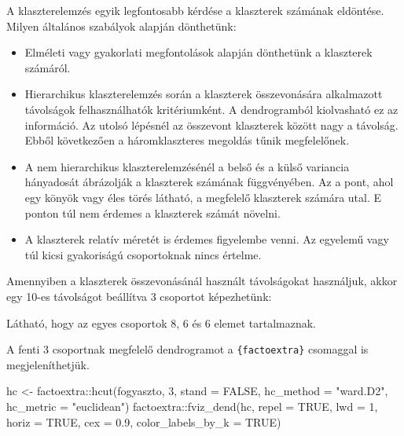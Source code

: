 \documentclass[
  letterpaper,
]{krantz}
\makeatletter
\newenvironment{Shaded}{\begin{snugshade}}{\end{snugshade}}
\newcommand{\AttributeTok}[1]{\textcolor[rgb]{0.40,0.45,0.13}{#1}}
\newcommand{\CommentTok}[1]{\textcolor[rgb]{0.37,0.37,0.37}{#1}}
\newcommand{\ConstantTok}[1]{\textcolor[rgb]{0.56,0.35,0.01}{#1}}
\newcommand{\DecValTok}[1]{\textcolor[rgb]{0.68,0.00,0.00}{#1}}
\newcommand{\FloatTok}[1]{\textcolor[rgb]{0.68,0.00,0.00}{#1}}
\newcommand{\FunctionTok}[1]{\textcolor[rgb]{0.28,0.35,0.67}{#1}}
\newcommand{\NormalTok}[1]{\textcolor[rgb]{0.00,0.23,0.31}{#1}}
\newcommand{\OtherTok}[1]{\textcolor[rgb]{0.00,0.23,0.31}{#1}}
\newcommand{\SpecialCharTok}[1]{\textcolor[rgb]{0.37,0.37,0.37}{#1}}
\newcommand{\StringTok}[1]{\textcolor[rgb]{0.13,0.47,0.30}{#1}}
\providecommand{\tightlist}{%
  \setlength{\itemsep}{0pt}\setlength{\parskip}{0pt}}\usepackage{longtable,booktabs,array}
\newenvironment{kframe}{%
\medskip{}
\setlength{\fboxsep}{.8em}
 \def\at@end@of@kframe{}%
 \ifinner\ifhmode%
  \def\at@end@of@kframe{\end{minipage}}%
  \begin{minipage}{\columnwidth}%
 \fi\fi%
 \def\FrameCommand##1{\hskip\@totalleftmargin \hskip-\fboxsep
 \colorbox{shadecolor}{##1}\hskip-\fboxsep
     \hskip-\linewidth \hskip-\@totalleftmargin \hskip\columnwidth}%
 \MakeFramed {\advance\hsize-\width
   \@totalleftmargin\z@ \linewidth\hsize
   \@setminipage}}%
 {\par\unskip\endMakeFramed%
 \at@end@of@kframe}
\renewenvironment{Shaded}{\begin{kframe}}{\end{kframe}}
\makeatother
\begin{document}
A klaszterelemzés egyik legfontosabb kérdése a klaszterek számának
eldöntése. Milyen általános szabályok alapján dönthetünk:

\begin{itemize}
\tightlist
\item
  Elméleti vagy gyakorlati megfontolások alapján dönthetünk a klaszterek
  számáról.
\item
  Hierarchikus klaszterelemzés során a klaszterek összevonására
  alkalmazott távolságok felhasználhatók kritériumként. A dendrogramból
  kiolvasható ez az információ. Az utolsó lépésnél az összevont
  klaszterek között nagy a távolság. Ebből következően a háromklaszteres
  megoldás tűnik megfelelőnek.
\item
  A nem hierarchikus klaszterelemzésénél a belső és a külső variancia
  hányadosát ábrázolják a klaszterek számának függvényében. Az a pont,
  ahol egy könyök vagy éles törés látható, a megfelelő klaszterek
  számára utal. E ponton túl nem érdemes a klaszterek számát növelni.
\item
  A klaszterek relatív méretét is érdemes figyelembe venni. Az egyelemű
  vagy túl kicsi gyakoriságú csoportoknak nincs értelme.
\end{itemize}

Amennyiben a klaszterek összevonásánál használt távolságokat használjuk,
akkor egy 10-es távolságot beállítva 3 csoportot képezhetünk:

\begin{Shaded}
\end{Shaded}

Látható, hogy az egyes csoportok 8, 6 és 6 elemet tartalmaznak.

A fenti 3 csoportnak megfelelő dendrogramot a \texttt{\{factoextra\}}
csomaggal is megjeleníthetjük.

\begin{Shaded}
\begin{Highlighting}[]
\NormalTok{hc }\OtherTok{\textless{}{-}}\NormalTok{ factoextra}\SpecialCharTok{::}\FunctionTok{hcut}\NormalTok{(fogyaszto, }\DecValTok{3}\NormalTok{, }\AttributeTok{stand =} \ConstantTok{FALSE}\NormalTok{, }\AttributeTok{hc\_method =} \StringTok{"ward.D2"}\NormalTok{,}
    \AttributeTok{hc\_metric =} \StringTok{"euclidean"}\NormalTok{)}
\NormalTok{factoextra}\SpecialCharTok{::}\FunctionTok{fviz\_dend}\NormalTok{(hc, }\AttributeTok{repel =} \ConstantTok{TRUE}\NormalTok{, }\AttributeTok{lwd =} \DecValTok{1}\NormalTok{, }\AttributeTok{horiz =} \ConstantTok{TRUE}\NormalTok{,}
    \AttributeTok{cex =} \FloatTok{0.9}\NormalTok{, }\AttributeTok{color\_labels\_by\_k =} \ConstantTok{TRUE}\NormalTok{)}
\end{Highlighting}
\end{Shaded}
\end{document}
